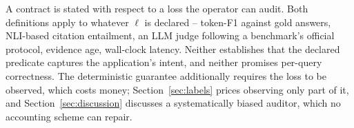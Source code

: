 \begin{rmk}
A contract is stated with respect to a loss the operator can audit.
Both definitions apply to whatever $\ell$ is declared -- token-F1
against gold answers, NLI-based citation entailment, an LLM judge
following a benchmark's official protocol, evidence age, wall-clock
latency. Neither establishes that the declared predicate captures the
application's intent, and neither promises per-query correctness. The
deterministic guarantee additionally requires the loss to be observed,
which costs money; Section~\ref{sec:labels} prices observing only part
of it, and Section~\ref{sec:discussion} discusses a systematically
biased auditor, which no accounting scheme can repair.
\end{rmk}
